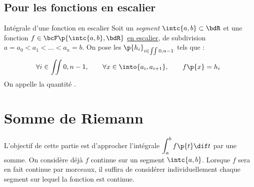 \documentclass[a4paper,french,bookmarks]{article}
\begin{document}
    \subsection{Pour les fonctions en escalier}
    
    \begin{definition}{Intégrale d'une fonction en escalier}{}
        Soit un \textit{segment} $\intc{a, b} \subset \bdR$ et une fonction $f \in \bcF\p{\intc{a, b}, \bdR}$ \underline{en escalier}, de subdivision $a = a_0 < a_1 < \dots < a_n = b$. On pose les $\p{h_i}_{i \in \iint{0, n-1}}$ tels que :
        \[ \forall i \in \iint{0, n-1},\qquad \forall x \in \into{a_i, a_{i+1}},\qquad f\p{x} = h_i\]
        On appelle  la quantité .
    \end{definition}
    
    \begin{property}{}{}
        
    \end{property}
    
    \newpage
    
    \section{Somme de Riemann}
    
    L'objectif de cette partie est d'approcher l'intégrale $\displaystyle\int_a^b f\p{t}\dif t$ par une somme. On considère déjà $f$ continue sur un segment $\intc{a, b}$. Lorsque $f$ sera en fait continue par morceaux, il suffira de considérer individuellement chaque segment sur lequel la fonction est continue.
    
\end{document}
